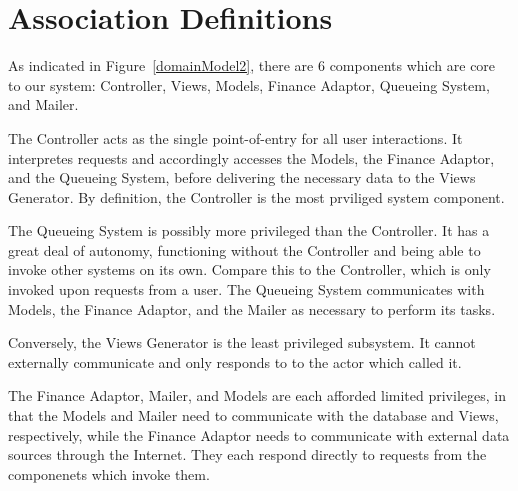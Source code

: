 %
%
%
%
\section{Association Definitions}

As indicated in Figure~\ref{domainModel2}, there are 6 components which are core
to our system: Controller, Views, Models, Finance Adaptor, Queueing System, and
Mailer.

The Controller acts as the single point-of-entry for all user interactions. It
interpretes requests and accordingly accesses the Models, the Finance Adaptor,
and the Queueing System, before delivering the necessary data to the Views
Generator. By definition, the Controller is the most prviliged system component.

The Queueing System is possibly more privileged than the Controller. It has a great deal
of autonomy, functioning without the Controller and being able to invoke other systems
on its own. Compare this to the Controller, which is only invoked upon requests from
a user. The Queueing System communicates with Models, the Finance Adaptor, and the 
Mailer as necessary to perform its tasks.

Conversely, the Views Generator is the least privileged subsystem. It cannot
externally communicate and only responds to to the actor which called it.

The Finance Adaptor, Mailer, and Models are each afforded limited privileges, in that the
Models and Mailer need to communicate with the database and Views, respectively, 
while the Finance Adaptor needs to communicate with external data sources through the Internet.
They each respond directly to requests from the componenets which invoke them.

